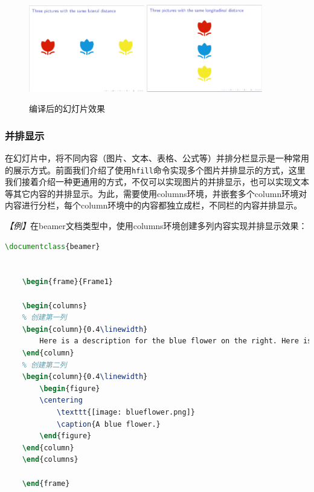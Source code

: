 \begin{figure}[htbp]
    \centering
    \includegraphics[width = 0.45\textwidth]{images/ch_9/eg6_4_1.png}
    \includegraphics[width = 0.45\textwidth]{images/ch_9/eg6_4_2.png}
    \caption{编译后的幻灯片效果}
    \label{fig:944}
\end{figure}

\subsubsection{并排显示}

在幻灯片中，将不同内容（图片、文本、表格、公式等）并排分栏显示是一种常用的展示方式。前面我们介绍了使用\texttt{hfill}命令实现多个图片并排显示的方式，这里我们接着介绍一种更通用的方式，不仅可以实现图片的并排显示，也可以实现文本等其它内容的并排显示。为此，需要使用columns环境，并嵌套多个column环境对内容进行分栏，每个column环境中的内容都独立成栏，不同栏的内容并排显示。

\emph{【例】}在beamer文档类型中，使用columns环境创建多列内容实现并排显示效果：
\begin{lstlisting}[language=TeX]
    \documentclass{beamer}

    
    \begin{frame}{Frame1}

    \begin{columns}
    % 创建第一列
    \begin{column}{0.4\linewidth}
        Here is a description for the blue flower on the right. Here is a description for the blue flower on the right.
    \end{column}
    % 创建第二列   
    \begin{column}{0.4\linewidth}
        \begin{figure}
        \centering
            \texttt{[image: blueflower.png]}
            \caption{A blue flower.}
        \end{figure}
    \end{column}
    \end{columns}

    \end{frame}

    
\end{lstlisting}

